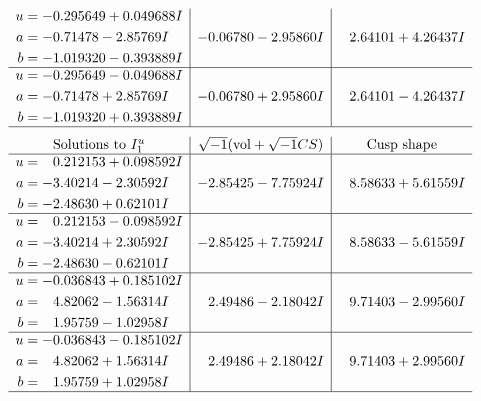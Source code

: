 \documentclass[1p]{elsarticle_modified}
\theoremstyle{definition}
\newcommand{\I}{\sqrt{-1}}
\begin{document}
$$\begin{array}{c|c|c}
\begin{aligned}
u &= -0.295649 + 0.049688 I \\
a &= -0.71478 - 2.85769 I \\
b &= -1.019320 - 0.393889 I\end{aligned}
 & -0.06780 - 2.95860 I & \phantom{-}2.64101 + 4.26437 I \\ \hline\begin{aligned}
u &= -0.295649 - 0.049688 I \\
a &= -0.71478 + 2.85769 I \\
b &= -1.019320 + 0.393889 I\end{aligned}
 & -0.06780 + 2.95860 I & \phantom{-}2.64101 - 4.26437 I\\
 \hline 
 \end{array}$$\newpage$$\begin{array}{c|c|c}  
\text{Solutions to }I^u_{1}& \I (\text{vol} + \sqrt{-1}CS) & \text{Cusp shape}\\
 \hline 
\begin{aligned}
u &= \phantom{-}0.212153 + 0.098592 I \\
a &= -3.40214 - 2.30592 I \\
b &= -2.48630 + 0.62101 I\end{aligned}
 & -2.85425 - 7.75924 I & \phantom{-}8.58633 + 5.61559 I \\ \hline\begin{aligned}
u &= \phantom{-}0.212153 - 0.098592 I \\
a &= -3.40214 + 2.30592 I \\
b &= -2.48630 - 0.62101 I\end{aligned}
 & -2.85425 + 7.75924 I & \phantom{-}8.58633 - 5.61559 I \\ \hline\begin{aligned}
u &= -0.036843 + 0.185102 I \\
a &= \phantom{-}4.82062 - 1.56314 I \\
b &= \phantom{-}1.95759 - 1.02958 I\end{aligned}
 & \phantom{-}2.49486 - 2.18042 I & \phantom{-}9.71403 - 2.99560 I \\ \hline\begin{aligned}
u &= -0.036843 - 0.185102 I \\
a &= \phantom{-}4.82062 + 1.56314 I \\
b &= \phantom{-}1.95759 + 1.02958 I\end{aligned}
 & \phantom{-}2.49486 + 2.18042 I & \phantom{-}9.71403 + 2.99560 I\\
 \hline 
 \end{array}$$\newpage\newpage\renewcommand{\arraystretch}{1}
\end{document}
